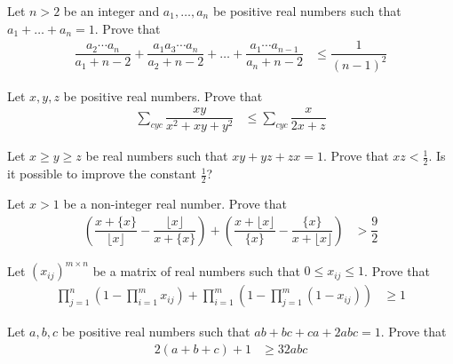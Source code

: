 \documentclass{subfile}
\begin{document}
		\begin{problem}[$2010$, problem $2$]
			Let $n>2$ be an integer and $a_{1},\ldots,a_{n}$ be positive real numbers such that $a_{1}+\ldots+a_{n}=1$. Prove that
				\begin{align*}
					\dfrac{a_{2}\cdots a_{n}}{a_{1}+n-2}+\dfrac{a_{1}a_{3}\cdots a_{n}}{a_{2}+n-2}+\ldots+\dfrac{a_{1}\cdots a_{n-1}}{a_{n}+n-2}
						& \leq \dfrac{1}{(n-1)^{2}}
				\end{align*}
		\end{problem}
	
		\begin{problem}[$2009$, problem $4$]
			Let $x,y,z$ be positive real numbers. Prove that
				\begin{align*}
					\sum_{cyc}\dfrac{xy}{x^{2}+xy+y^{2}}
						& \leq \sum_{cyc}\dfrac{x}{2x+z}
				\end{align*}
		\end{problem}
	
		\begin{problem}[$2007$, problem $1$]
			Let $x\geq y\geq z$ be real numbers such that $xy+yz+zx=1$. Prove that $xz<\frac{1}{2}$. Is it possible to improve the constant $\frac{1}{2}$?
		\end{problem}
	
		\begin{problem}[$2007$, problem $4$]
			Let $x>1$ be a non-integer real number. Prove that
				\begin{align*}
					\left(\dfrac{x+\{x\}}{\lfloor x\rfloor}-\dfrac{\lfloor x\rfloor}{x+\{x\}}\right)+\left(\dfrac{x+\lfloor x\rfloor}{\{x\}}-\dfrac{\{x\}}{x+\lfloor x\rfloor}\right)
						& > \dfrac{9}{2}
				\end{align*}
		\end{problem}
	
		\begin{problem}[$2007$, problem $4$]
			Let $(x_{ij})^{m\times n}$ be a matrix of real numbers such that $0\leq x_{ij}\leq 1$. Prove that
				\begin{align*}
					\prod_{j=1}^{n}\left(1-\prod_{i=1}^{m}x_{ij}\right)+\prod_{i=1}^{m}\left(1-\prod_{j=1}^{m}(1-x_{ij})\right)
						& \geq 1
				\end{align*}
		\end{problem}
	
		\begin{problem}[$2004$, problem $3$]
			Let $a,b,c$ be positive real numbers such that $ab+bc+ca+2abc=1$. Prove that
				\begin{align*}
					2(a+b+c)+1
						& \geq 32abc
				\end{align*}
		\end{problem}
	
\end{document}
